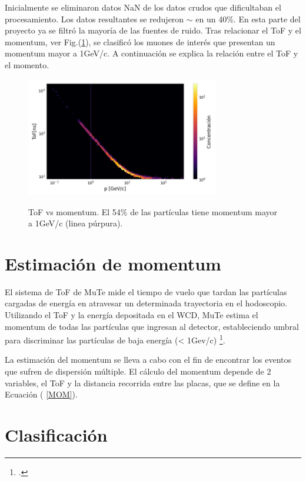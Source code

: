 Inicialmente se eliminaron datos NaN de los datos crudos que dificultaban el procesamiento. Los datos resultantes se redujeron $\sim$ en un 40$\%$. En esta parte del proyecto ya se filtró la mayoría de las fuentes de ruido. 
Tras relacionar el ToF y el momentum, ver Fig.(\ref{doce}), se clasificó los muones de interés que presentan un momentum mayor a 1GeV/c. A continuación se explica la relación entre el ToF y el momento.\\ 

\begin{figure}[h!]
\begin{center}
\caption{ToF vs momentum. El 54$ \%$ de las partículas tiene momentum mayor a 1GeV/c (linea púrpura).}
\includegraphics[width=0.75\textwidth]{Figures/imagenes/11.png}

\label{doce}
\end{center}
\end{figure}

\section{Estimación de momentum}
El sistema de ToF de MuTe mide el tiempo de vuelo que tardan las partículas cargadas de energía en atravesar un determinada trayectoria en el hodoscopio. Utilizando el ToF y la energía depositada en el WCD, MuTe estima el momentum de todas las partículas que ingresan al detector, estableciendo umbral para discriminar las partículas de baja energía (< 1Gev/c) \footcite{jesusP}.

La estimación del momentum se lleva a cabo con el fin de encontrar los eventos que sufren de dispersión múltiple. El cálculo del momentum depende de 2 variables, el ToF y la distancia recorrida entre las placas, que se define en la Ecuación ( \ref{MOM}).

\section{Clasificación}

